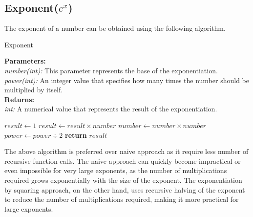 \documentclass{report}
\begin{document}
\subsection{Exponent($e^x$)}
  \begin{flushleft}
    The exponent of a number can be obtained using the following algorithm.
  \end{flushleft}

  \begin{algorithm}
    \caption{Exponent}\label{exp}
      \begin{tabbing}
        \textbf{Parameters:}\\
          \hspace{1em}\textit{number(int):} This parameter represents the base of the exponentiation.\\
          \hspace{1em}\textit{power(int):} An integer value that specifies how many times the number should be multiplied by itself.\\
          
        \textbf{Returns:}\\
          \hspace{1em}\textit{int:}  A numerical value that represents the result of the exponentiation.
      \end{tabbing}
      \vspace{1 em}
    \begin{algorithmic}
          \State $result \gets 1$
                  \State $result \gets result \times number$
              \EndIf
              \State $number \gets number \times number$
              \State $power \gets power \div 2$ 
          \EndWhile
          \State \textbf{return} $result$
      \EndFunction
      \end{algorithmic}
  \end{algorithm}
  \begin{flushleft}
    The above algorithm is preferred over naive approach as it require less number of recursive function calls.
    The naive approach can quickly become impractical or even impossible for very large exponents, as the number of multiplications required grows exponentially with the size of the exponent. The exponentiation by squaring approach, on the other hand, uses recursive halving of the exponent to reduce the number of multiplications required, making it more practical for large exponents.
  \end{flushleft}
\pagebreak
\end{document}

